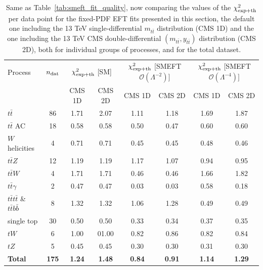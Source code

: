 \documentclass[withindex,glossary]{cam-thesis}
\begin{document}
\begin{table}[thb]
\begin{center}
\centering
\renewcommand{\arraystretch}{1.2}
\begin{tabularx}{\textwidth}{l|c|cc|cc|cc}
\toprule
Process  & $n_{\rm dat}$ &
\multicolumn{2}{|c|}{\footnotesize $\chi^2_{\rm exp+th}$ [SM]} &
\multicolumn{2}{|c|}{\footnotesize $\chi^2_{\rm exp+th}$ [SMEFT $\mathcal{O}(\Lambda^{-2})]$}&
\multicolumn{2}{|c}{\footnotesize $\chi^2_{\rm exp+th}$ [SMEFT $\mathcal{O}(\Lambda^{-4})]$}\\
& & {\footnotesize CMS 1D} &{\footnotesize CMS 2D }& {\footnotesize CMS 1D }& {\footnotesize CMS 2D} & {\footnotesize CMS 1D} & {\footnotesize CMS 2D}\\
\midrule
	$t \bar{t}$ & 86 & 1.71 & 2.07 & 1.11 &  1.18 & 1.69& 1.87\\
	$t \bar{t}$ AC & 18 & 0.58 & 0.58 & 0.50 & 0.47 & 0.60& 0.60 \\
	$W$ helicities & 4 & 0.71 & 0.71& 0.45 & 0.45 & 0.48& 0.46  \\
        \midrule
	$t\bar{t}Z$ & 12 & 1.19 & 1.19 & 1.17 & 1.07  &0.94 & 0.95  \\ 
	$t\bar{t}W$ & 4 & 1.71 & 1.71& 0.46 & 0.46 &1.66 & 1.82\\
        $t \bar{t} \gamma$ & 2 & 0.47 & 0.47& 0.03 & 0.03& 0.58 & 0.18\\ 
        \midrule
        $t \bar{t} t \bar{t}$ \& $t \bar{t} b \bar{b}$ & 8 & 1.32 &
        1.32 & 1.06 & 1.28& 0.49 & 0.49  \\
        \midrule
        single top & 30 & 0.50 & 0.50 & 0.33 & 0.34 & 0.37 & 0.35\\ 
        $tW$ & 6 & 1.00 & 01.00& 0.82 & 0.86 & 0.82 & 0.84\\ 
        $tZ$ & 5 & 0.45 & 0.45& 0.30 & 0.30 & 0.31 & 0.30\\
        \midrule
        {\bf Total} & {\bf 175} & {\bf 1.24} & {\bf 1.48} & {\bf
          0.84} & {\bf 0.91} & {\bf 1.14}  & {\bf 1.29}\\ 
\bottomrule
\end{tabularx}
\end{center}
\caption{\label{tab:chi2-cms2d1d} Same as Table~\ref{tab:smeft_fit_quality}, now comparing the values of the $\chi^2_{\rm exp+th}$ per data point for
  the fixed-PDF EFT fits presented in this section, the default one including the 13 TeV single-differential $m_{t\bar{t}}$ distribution (CMS 1D) and the one including the 13 TeV  CMS double-differential $(m_{t\bar{t}},y_{t\bar{t}})$  distribution (CMS 2D), both for individual groups of processes, and for the total dataset.
}
\end{table}
\end{document}
